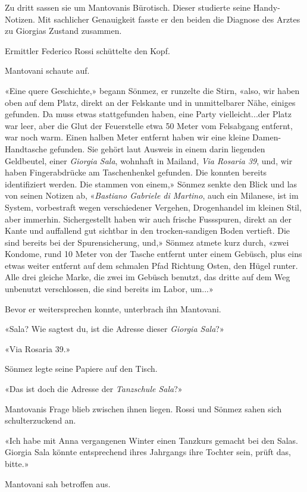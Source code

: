 Zu dritt sassen sie um Mantovanis Bürotisch. Dieser studierte seine
Handy-Notizen. Mit sachlicher Genauigkeit fasste er den beiden die
Diagnose des Arztes zu Giorgias Zustand zusammen.

Ermittler Federico Rossi schüttelte den Kopf.

Mantovani schaute auf.

«Eine quere Geschichte,» begann Sönmez, er runzelte die Stirn, «also,
wir haben oben auf dem Platz, direkt an der Felskante und in
unmittelbarer Nähe, einiges gefunden. Da muss etwas stattgefunden haben,
eine Party vielleicht...der Platz war leer, aber die Glut der
Feuerstelle etwa 50 Meter vom Felsabgang entfernt, war noch warm. Einen
halben Meter entfernt haben wir eine kleine Damen-Handtasche gefunden.
Sie gehört laut Ausweis in einem darin liegenden Geldbeutel, einer
\emph{Giorgia Sala}, wohnhaft in Mailand, \emph{Via Rosaria 39}, und,
wir haben Fingerabdrücke am Taschenhenkel gefunden. Die konnten bereits
identifiziert werden. Die stammen von einem,» Sönmez senkte den Blick
und las von seinen Notizen ab, «\emph{Bastiano Gabriele di Martino},
auch ein Milanese, ist im System, vorbestraft wegen verschiedener
Vergehen, Drogenhandel im kleinen Stil, aber immerhin. Sichergestellt
haben wir auch frische Fussspuren, direkt an der Kante und auffallend
gut sichtbar in den trocken-sandigen Boden vertieft. Die sind bereits
bei der Spurensicherung, und,» Sönmez atmete kurz durch, «zwei Kondome,
rund 10 Meter von der Tasche entfernt unter einem Gebüsch, plus eins
etwas weiter entfernt auf dem schmalen Pfad Richtung Osten, den Hügel
runter. Alle drei gleiche Marke, die zwei im Gebüsch benutzt, das dritte
auf dem Weg unbenutzt verschlossen, die sind bereits im Labor, um...»

Bevor er weitersprechen konnte, unterbrach ihn Mantovani.

«Sala? Wie sagtest du, ist die Adresse dieser \emph{Giorgia Sala}?»

«Via Rosaria 39.»

Sönmez legte seine Papiere auf den Tisch.

«Das ist doch die Adresse der \emph{Tanzschule Sala}?»

Mantovanis Frage blieb zwischen ihnen liegen. Rossi und Sönmez sahen
sich schulterzuckend an.

«Ich habe mit Anna vergangenen Winter einen Tanzkurs gemacht bei den
Salas. Giorgia Sala könnte entsprechend ihres Jahrgangs ihre Tochter
sein, prüft das, bitte.»

Mantovani sah betroffen aus.

